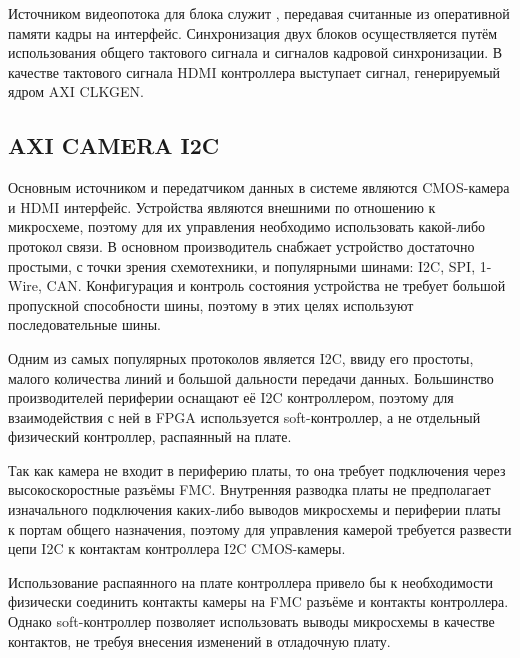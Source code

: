 Источником видеопотока для блока служит , передавая считанные из оперативной памяти
кадры на  интерфейс. Синхронизация двух блоков осуществляется путём использования
общего тактового сигнала и сигналов кадровой синхронизации. В качестве тактового сигнала HDMI контроллера
выступает сигнал, генерируемый ядром AXI CLKGEN.

\subsection{AXI CAMERA I2C}
\label{sec:functional:axi_camera_i2c}

Основным источником и передатчиком данных в системе являются CMOS-камера и HDMI интерфейс.
Устройства являются внешними по отношению к микросхеме, поэтому для их управления необходимо использовать
какой-либо протокол связи. В основном производитель снабжает устройство достаточно простыми, с точки зрения
схемотехники, и популярными шинами: I2C, SPI, 1-Wire, CAN. Конфигурация и контроль состояния устройства не требует
большой пропускной способности шины, поэтому в этих целях используют последовательные шины.

Одним из самых популярных протоколов является I2C, ввиду его простоты, малого количества линий и большой
дальности передачи данных. Большинство производителей периферии оснащают её I2C контроллером, поэтому
для взаимодействия с ней в FPGA используется soft-контроллер, а не отдельный физический контроллер, распаянный
на плате.

Так как камера не входит в периферию платы, то она требует подключения через высокоскоростные разъёмы FMC.
Внутренняя разводка платы не предполагает изначального подключения каких-либо выводов микросхемы и периферии
платы к портам общего назначения, поэтому для управления камерой требуется развести цепи I2C к контактам контроллера I2C CMOS-камеры.

Использование распаянного на плате контроллера привело бы к необходимости физически соединить
контакты камеры на FMC разъёме и контакты контроллера. Однако soft-контроллер позволяет использовать
выводы микросхемы в качестве контактов, не требуя внесения изменений в отладочную плату.

